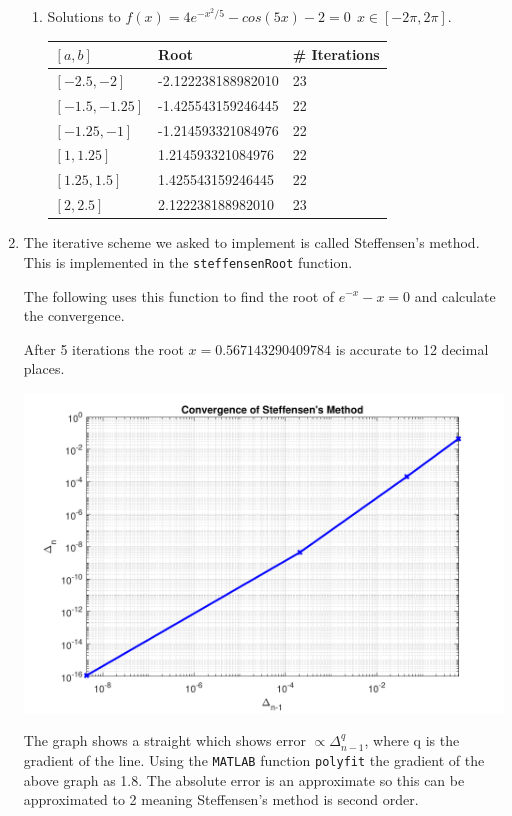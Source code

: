 \documentclass[a4paper,11pt]{article}
\begin{document}
\begin{enumerate}
\begin{enumerate}
		
		\item Solutions to $f(x) = 4e^{-x^{2}/5} - cos(5x) - 2 = 0 \  \ 
		x\in[-2\pi,2\pi]$.
		
		\begin{center}
			\begin{tabular}{l|ll}
				$[a,b]$        & Root       & \# Iterations \\ \hline
				$[-2.5,-2]$    & -2.122238188982010 & 23            \\
				$[-1.5,-1.25]$ & -1.425543159246445 & 22            \\
				$[-1.25,-1]$   & -1.214593321084976 & 22            \\
				$[1,1.25]$     & 1.214593321084976  & 22            \\
				$[1.25,1.5]$   & 1.425543159246445  & 22            \\
				$[2,2.5]$      & 2.122238188982010  & 23           
			\end{tabular}
		\end{center}
	\end{enumerate}


	\item The iterative scheme we asked to implement is called Steffensen's 
	method\cite{wiki:Steffensen's_method}. This is implemented in the 
	\verb*|steffensenRoot| function.
	
	The following uses this function to find the root of $e^{-x} - x = 0$ and 
	calculate the convergence.
	
	After 5 iterations the root $x = 0.567143290409784$ is accurate to 12 
	decimal places.
	\begin{center}
		\includegraphics[scale=0.6]{images/Q1c.pdf}
	\end{center}
	The graph shows a straight which shows error $\propto \Delta_{n-1}^{q}$, 
	where q is the gradient of the line. Using the \verb*|MATLAB| function 
	\verb*|polyfit| the gradient of the 
	above graph as 1.8. The absolute error is an approximate so this can be 
	approximated to 2 meaning Steffensen's method is second order.
	

\end{enumerate}
\end{document}
